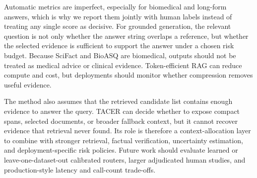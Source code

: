 \documentclass[11pt]{article}
\begin{document}
Automatic metrics are imperfect, especially for biomedical and long-form answers, which is why we report them jointly with human labels instead of treating any single score as decisive. For grounded generation, the relevant question is not only whether the answer string overlaps a reference, but whether the selected evidence is sufficient to support the answer under a chosen risk budget. Because SciFact and BioASQ are biomedical, outputs should not be treated as medical advice or clinical evidence. Token-efficient RAG can reduce compute and cost, but deployments should monitor whether compression removes useful evidence.

The method also assumes that the retrieved candidate list contains enough evidence to answer the query. TACER can decide whether to expose compact spans, selected documents, or broader fallback context, but it cannot recover evidence that retrieval never found. Its role is therefore a context-allocation layer to combine with stronger retrieval, factual verification, uncertainty estimation, and deployment-specific risk policies. Future work should evaluate learned or leave-one-dataset-out calibrated routers, larger adjudicated human studies, and production-style latency and call-count trade-offs.

\clearpage



\end{document}

